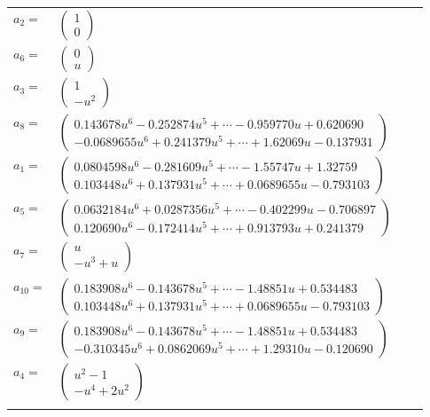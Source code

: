 \documentclass[1p]{elsarticle_modified}
\theoremstyle{definition}
\begin{document}
\begin{tabular}{m{7pt} m{180pt} m{7pt} m{180pt} }
\flushright $a_{2}=$&$\begin{pmatrix}1\\0\end{pmatrix}$ \\
\flushright $a_{6}=$&$\begin{pmatrix}0\\u\end{pmatrix}$ \\
\flushright $a_{3}=$&$\begin{pmatrix}1\\- u^2\end{pmatrix}$ \\
\flushright $a_{8}=$&$\begin{pmatrix}0.143678 u^{6}-0.252874 u^{5}+\cdots-0.959770 u+0.620690\\-0.0689655 u^{6}+0.241379 u^{5}+\cdots+1.62069 u-0.137931\end{pmatrix}$ \\
\flushright $a_{1}=$&$\begin{pmatrix}0.0804598 u^{6}-0.281609 u^{5}+\cdots-1.55747 u+1.32759\\0.103448 u^{6}+0.137931 u^{5}+\cdots+0.0689655 u-0.793103\end{pmatrix}$ \\
\flushright $a_{5}=$&$\begin{pmatrix}0.0632184 u^{6}+0.0287356 u^{5}+\cdots-0.402299 u-0.706897\\0.120690 u^{6}-0.172414 u^{5}+\cdots+0.913793 u+0.241379\end{pmatrix}$ \\
\flushright $a_{7}=$&$\begin{pmatrix}u\\- u^3+u\end{pmatrix}$ \\
\flushright $a_{10}=$&$\begin{pmatrix}0.183908 u^{6}-0.143678 u^{5}+\cdots-1.48851 u+0.534483\\0.103448 u^{6}+0.137931 u^{5}+\cdots+0.0689655 u-0.793103\end{pmatrix}$ \\
\flushright $a_{9}=$&$\begin{pmatrix}0.183908 u^{6}-0.143678 u^{5}+\cdots-1.48851 u+0.534483\\-0.310345 u^{6}+0.0862069 u^{5}+\cdots+1.29310 u-0.120690\end{pmatrix}$ \\
\flushright $a_{4}=$&$\begin{pmatrix}u^2-1\\- u^4+2 u^2\end{pmatrix}$\\&\end{tabular}
\end{document}
